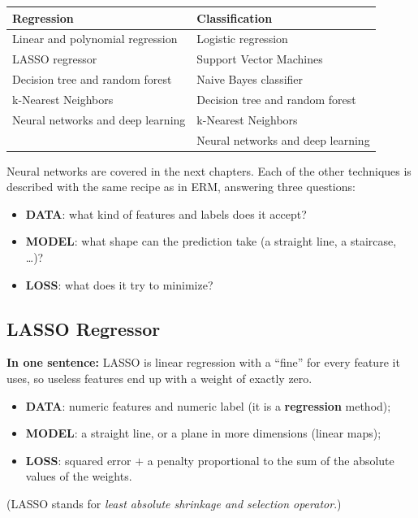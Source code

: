 \begin{center}
    \begin{tabular}{l|l}
        \textbf{Regression} & \textbf{Classification} \\ \hline
        Linear and polynomial regression & Logistic regression \\
        LASSO regressor & Support Vector Machines \\
        Decision tree and random forest & Naive Bayes classifier \\
        k-Nearest Neighbors & Decision tree and random forest \\
        Neural networks and deep learning & k-Nearest Neighbors \\
        & Neural networks and deep learning \\
    \end{tabular}
\end{center}
Neural networks are covered in the next chapters. Each of the other techniques is described with the same recipe as in ERM, answering three questions:
\begin{itemize}
    \item \textbf{DATA}: what kind of features and labels does it accept?
    \item \textbf{MODEL}: what shape can the prediction take (a straight line, a staircase, \dots)?
    \item \textbf{LOSS}: what does it try to minimize?
\end{itemize}

\subsection{LASSO Regressor}
\textbf{In one sentence:} LASSO is linear regression with a ``fine'' for every feature it uses, so useless features end up with a weight of exactly zero.

\begin{itemize}
    \item \textbf{DATA}: numeric features and numeric label (it is a \textbf{regression} method);
    \item \textbf{MODEL}: a straight line, or a plane in more dimensions (linear maps);
    \item \textbf{LOSS}: squared error $+$ a penalty proportional to the sum of the absolute values of the weights.
\end{itemize}
(LASSO stands for \emph{least absolute shrinkage and selection operator}.)

